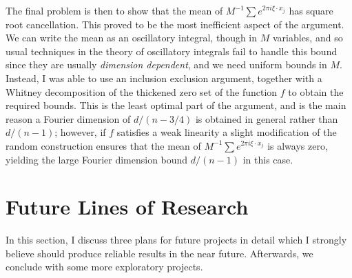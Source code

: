 \documentclass[11pt]{article}
\begin{document}
The final problem is then to show that the mean of $M^{-1} \sum e^{2 \pi i \xi \cdot x_j}$ has square root cancellation. This proved to be the most inefficient aspect of the argument. We can write the mean as an oscillatory integral, though in $M$ variables, and so usual techniques in the theory of oscillatory integrals fail to handle this bound since they are usually \emph{dimension dependent}, and we need uniform bounds in $M$. Instead, I was able to use an inclusion exclusion argument, together with a Whitney decomposition of the thickened zero set of the function $f$ to obtain the required bounds. This is the least optimal part of the argument, and is the main reason a Fourier dimension of $d/(n-3/4)$ is obtained in general rather than $d/(n-1)$; however, if $f$ satisfies a weak linearity a slight modification of the random construction ensures that the mean of $M^{-1} \sum e^{2 \pi i \xi \cdot x_j}$ is always zero, yielding the large Fourier dimension bound $d/(n-1)$ in this case. %

\section{Future Lines of Research} \label{Section3}

In this section, I discuss three plans for future projects in detail which I strongly believe should produce reliable results in the near future. Afterwards, we conclude with some more exploratory projects.

\end{document}

